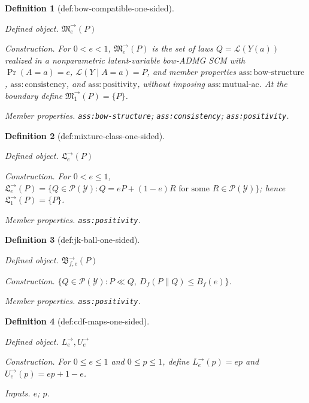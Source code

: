 \documentclass{article}
\newtheorem{definition}{Definition}
\begin{document}
\begin{definition}[def:bow-compatible-one-sided]\label{def:bow-compatible-one-sided}
\par\smallskip\noindent\emph{Defined object.} \(\mathfrak M^{\to}_e(P)\)
\par\smallskip\noindent\emph{Construction.} For \(0<e<1\), \(\mathfrak M^{\to}_e(P)\) is the set of laws \(Q=\mathcal L(Y(a))\) realized in a nonparametric latent-variable bow-ADMG SCM with \(\Pr(A=a)=e\), \(\mathcal L(Y\mid A=a)=P\), and member properties \(\mathrm{ass:bow\text{-}structure}\), \(\mathrm{ass:consistency}\), and \(\mathrm{ass:positivity}\), without imposing \(\mathrm{ass:mutual\text{-}ac}\). At the boundary define \(\mathfrak M^{\to}_1(P)=\{P\}\).
\par\smallskip\noindent\emph{Member properties.} \texttt{ass:\allowbreak{}bow-\allowbreak{}structure}; \texttt{ass:\allowbreak{}consistency}; \texttt{ass:\allowbreak{}positivity}.
\end{definition}

\begin{definition}[def:mixture-class-one-sided]\label{def:mixture-class-one-sided}
\par\smallskip\noindent\emph{Defined object.} \(\mathfrak L^{\to}_e(P)\)
\par\smallskip\noindent\emph{Construction.} For \(0<e\le1\), \(\mathfrak L^{\to}_e(P)=\{Q\in\mathcal P(\mathcal Y):Q=eP+(1-e)R\text{ for some }R\in\mathcal P(\mathcal Y)\}\); hence \(\mathfrak L^{\to}_1(P)=\{P\}\).
\par\smallskip\noindent\emph{Member properties.} \texttt{ass:\allowbreak{}positivity}.
\end{definition}

\begin{definition}[def:jk-ball-one-sided]\label{def:jk-ball-one-sided}
\par\smallskip\noindent\emph{Defined object.} \(\mathfrak B^{\to}_{f,e}(P)\)
\par\smallskip\noindent\emph{Construction.} \(\{Q\in\mathcal P(\mathcal Y):P\ll Q,\ D_f(P\|Q)\le B_f(e)\}\).
\par\smallskip\noindent\emph{Member properties.} \texttt{ass:\allowbreak{}positivity}.
\end{definition}

\begin{definition}[def:cdf-maps-one-sided]\label{def:cdf-maps-one-sided}
\par\smallskip\noindent\emph{Defined object.} \(L^{\to}_e,U^{\to}_e\)
\par\smallskip\noindent\emph{Construction.} For \(0\le e\le1\) and \(0\le p\le1\), define \(L^{\to}_e(p)=ep\) and \(U^{\to}_e(p)=ep+1-e\).
\par\smallskip\noindent\emph{Inputs.} \(e\); \(p\).
\end{definition}
\end{document}
